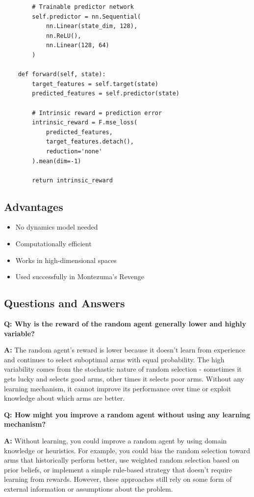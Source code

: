 \documentclass[12pt]{article}
\begin{document}
{{{\begin{verbatim}
        # Trainable predictor network
        self.predictor = nn.Sequential(
            nn.Linear(state_dim, 128),
            nn.ReLU(),
            nn.Linear(128, 64)
        )
    
    def forward(self, state):
        target_features = self.target(state)
        predicted_features = self.predictor(state)
        
        # Intrinsic reward = prediction error
        intrinsic_reward = F.mse_loss(
            predicted_features, 
            target_features.detach(),
            reduction='none'
        ).mean(dim=-1)
        
        return intrinsic_reward
\end{verbatim}

\subsection{Advantages}

\begin{itemize}
\item No dynamics model needed
\item Computationally efficient
\item Works in high-dimensional spaces
\item Used successfully in Montezuma's Revenge
\end{itemize}

\subsection{Questions and Answers}

\textbf{Q: Why is the reward of the random agent generally lower and highly variable?}

\textbf{A:} The random agent's reward is lower because it doesn't learn from experience and continues to select suboptimal arms with equal probability. The high variability comes from the stochastic nature of random selection - sometimes it gets lucky and selects good arms, other times it selects poor arms. Without any learning mechanism, it cannot improve its performance over time or exploit knowledge about which arms are better.

\textbf{Q: How might you improve a random agent without using any learning mechanism?}

\textbf{A:} Without learning, you could improve a random agent by using domain knowledge or heuristics. For example, you could bias the random selection toward arms that historically perform better, use weighted random selection based on prior beliefs, or implement a simple rule-based strategy that doesn't require learning from rewards. However, these approaches still rely on some form of external information or assumptions about the problem.

}}}
\end{document}
